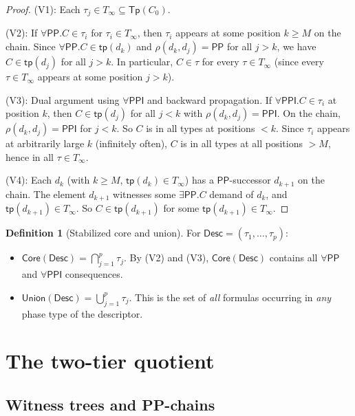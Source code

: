 \documentclass[a4paper,11pt]{article}
\theoremstyle{definition}
\newtheorem{definition}[theorem]{Definition}
\newcommand{\PP}{\ensuremath{\mathsf{PP}}}
\newcommand{\PPI}{\ensuremath{\mathsf{PPI}}}
\newcommand{\tp}{\ensuremath{\mathsf{tp}}}
\newcommand{\Tp}{\ensuremath{\mathsf{Tp}}}
\newcommand{\Desc}{\ensuremath{\mathsf{Desc}}}
\newcommand{\Core}{\ensuremath{\mathsf{Core}}}
\newcommand{\Union}{\ensuremath{\mathsf{Union}}}
\begin{document}
\begin{proof}
(V1): Each $\tau_j \in T_\infty \subseteq \Tp(C_0)$.

(V2): If $\forall\PP.C \in \tau_i$ for $\tau_i \in T_\infty$, then
$\tau_i$ appears at some position $k \ge M$ on the chain.  Since
$\forall\PP.C \in \tp(d_k)$ and $\rho(d_k, d_j) = \PP$ for all
$j > k$, we have $C \in \tp(d_j)$ for all $j > k$.  In particular,
$C \in \tau$ for every $\tau \in T_\infty$ (since every $\tau \in
T_\infty$ appears at some position $j > k$).

(V3): Dual argument using $\forall\PPI$ and backward propagation.
If $\forall\PPI.C \in \tau_i$ at position $k$, then $C \in \tp(d_j)$
for all $j < k$ with $\rho(d_k, d_j) = \PPI$.  On the chain,
$\rho(d_k, d_j) = \PPI$ for $j < k$.  So $C$ is in all types
at positions $< k$.  Since $\tau_i$ appears at arbitrarily large $k$
(infinitely often), $C$ is in all types at all positions $> M$,
hence in all $\tau \in T_\infty$.

(V4): Each $d_k$ (with $k \ge M$, $\tp(d_k) \in T_\infty$) has a
$\PP$-successor $d_{k+1}$ on the chain.  The element $d_{k+1}$
witnesses some $\exists\PP.C$ demand of $d_k$, and
$\tp(d_{k+1}) \in T_\infty$.  So $C \in \tp(d_{k+1})$ for some
$\tp(d_{k+1}) \in T_\infty$.
\end{proof}

\begin{definition}[Stabilized core and union]\label{def:core-union}
For $\Desc = (\tau_1, \ldots, \tau_p)$:
\begin{itemize}
\item $\Core(\Desc) = \bigcap_{j=1}^{p} \tau_j$.\;
  By (V2) and (V3), $\Core(\Desc)$ contains all $\forall\PP$ and
  $\forall\PPI$ consequences.
\item $\Union(\Desc) = \bigcup_{j=1}^{p} \tau_j$.\;
  This is the set of \emph{all} formulas occurring in \emph{any} phase
  type of the descriptor.
\end{itemize}
\end{definition}


\section{The two-tier quotient}\label{sec:quotient}

\subsection{Witness trees and PP-chains}
\end{document}

